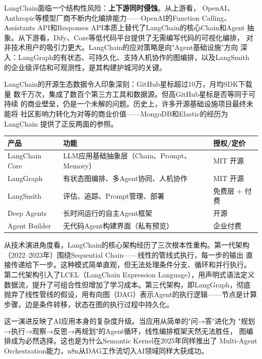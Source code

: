 \begin{whybox}
LangChain面临一个结构性风险：\textbf{上下游同时侵蚀}。从上游看，
OpenAI、Anthropic等模型厂商不断内化编排能力——OpenAI的Function Calling、
Assistants API和Responses API本质上替代了LangChain的核心Chain和Agent
抽象。从下游看，Dify、Coze等低代码平台提供了无需编写代码的可视化编排，
对非技术用户的吸引力更大。LangChain的应对策略是向"Agent基础设施"方向
深入：LangGraph的有状态、可持久化、支持人机协作的图编排，以及LangSmith
的企业级评估和可观测性，是其构建护城河的关键。
\end{whybox}

LangChain的开源生态数据令人印象深刻：GitHub星标超过10万，月均SDK下载量
数千万次，集成了数百个第三方工具和数据源。但高GitHub星标是否等同于可持续
的商业壁垒，仍是一个未解的问题。历史上，许多开源基础设施项目最终未能将
社区影响力转化为对等的商业价值——MongoDB和Elastic的经历为LangChain
提供了正反两面的参照。

\begin{keybox}
\small
\begin{tabularx}{\textwidth}{l X l}
\toprule
\rowcolor{figLightGray}
\textbf{产品} & \textbf{功能} & \textbf{授权/定价} \\
\midrule
LangChain Core  & LLM应用基础抽象层（Chain、Prompt、Memory） & MIT 开源 \\
LangGraph       & 有状态图编排、多Agent协同、人机协作         & MIT 开源 \\
LangSmith       & 评估、追踪、Prompt管理、部署               & 免费层 + 付费 \\
Deep Agents     & 长时间运行的自主Agent框架                   & 开源 \\
Agent Builder    & 无代码Agent构建界面（私有预览）             & 企业付费 \\
\bottomrule
\end{tabularx}
\end{keybox}

从技术演进角度看，LangChain的核心架构经历了三次根本性重构。第一代架构
（2022--2023年）围绕Sequential Chain——线性的管线式执行，每一步的输出
直接传递给下一步。这种模式简单直观，但无法处理条件分支、循环和并行执行。
第二代架构引入了LCEL（LangChain Expression Language），用声明式语法定义
数据流，提升了可组合性但增加了学习成本。第三代架构，即LangGraph，彻底
抛弃了线性管线的假设，用有向图（DAG）表示Agent的执行逻辑——节点是计算
步骤，边是条件转移，状态在图的执行过程中持久化。

这一演进反映了AI应用本身的复杂度升级。当应用从简单的"问→答"进化为
"规划→执行→观察→反思→再规划"的Agent循环，线性编排框架天然无法胜任，
图编排成为必然选择。这也是为什么Semantic Kernel在2025年同样推出了
Multi-Agent Orchestration能力，n8n从DAG工作流切入AI领域同样大获成功。

